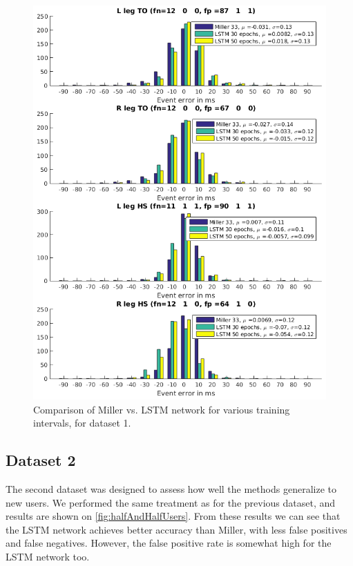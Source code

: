 \documentclass{acm_proc_article-sp}
\begin{document}
\begin{figure}[H]
 \centering
 \includegraphics[scale=.31]{./figures/Test1_1Train1_2Compare.png}
 \caption{Comparison of Miller vs. LSTM network for various training intervals, for dataset 1.}
 \label{fig:halfAndHalfTrials}
\end{figure}

\subsection{Dataset 2}
The second dataset was designed to assess how well the methods generalize to new users. We performed the same treatment as for the previous dataset, and results are shown on \ref{fig:halfAndHalfUsers}. From these results we can see that the LSTM network achieves better accuracy than Miller, with less false positives and false negatives. However, the false positive rate is somewhat high for the LSTM network too. 
\end{document}
